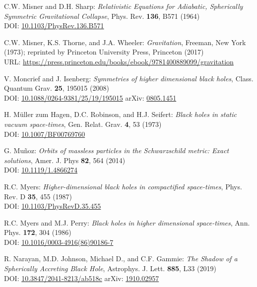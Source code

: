 \begin{thebibliography}{123}
C.W. Misner and D.H. Sharp:
{\em Relativistic Equations for Adiabatic, Spherically Symmetric Gravitational Collapse},
Phys. Rev. {\bf 136}, B571 (1964)\\
DOI: \href{https://doi.org/10.1103/PhysRev.136.B571}{10.1103/PhysRev.136.B571}

C.W. Misner, K.S. Thorne, and J.A. Wheeler:
{\em Gravitation},
Freeman, New York (1973);
reprinted by Princeton University Press, Princeton (2017)\\
URL: \url{https://press.princeton.edu/books/ebook/9781400889099/gravitation}

V. Moncrief and J. Isenberg:
{\em Symmetries of higher dimensional black holes},
Class. Quantum Grav. {\bf 25}, 195015 (2008)\\
DOI: \href{https://doi.org/10.1088/0264-9381/25/19/195015}{10.1088/0264-9381/25/19/195015}\hfill
arXiv: \href{https://arxiv.org/abs/0805.1451}{0805.1451}

H. Müller zum Hagen, D.C. Robinson, and H.J. Seifert:
{\em Black holes in static vacuum space-times},
Gen. Relat. Grav. {\bf 4}, 53 (1973)\\
DOI: \href{https://doi.org/10.1007/BF00769760}{10.1007/BF00769760}

G. Mu\~noz:
{\em Orbits of massless particles in the Schwarzschild metric: Exact solutions},
Amer. J. Phys {\bf 82}, 564 (2014)\\
DOI: \href{https://doi.org/10.1119/1.4866274}{10.1119/1.4866274}

R.C. Myers:
{\em Higher-dimensional black holes in compactified space-times},
Phys. Rev. D {\bf 35}, 455 (1987)\\
DOI: \href{https://doi.org/10.1103/PhysRevD.35.455}{10.1103/PhysRevD.35.455}

R.C. Myers and M.J. Perry:
{\em Black holes in higher dimensional space-times},
Ann. Phys. {\bf 172}, 304 (1986)\\
DOI: \href{https://doi.org/10.1016/0003-4916(86)90186-7}{10.1016/0003-4916(86)90186-7}

R. Narayan, M.D. Johnson, Michael D., and C.F. Gammie:
{\em The Shadow of a Spherically Accreting Black Hole},
Astrophys. J. Lett. {\bf 885}, L33 (2019)\\
DOI: \href{https://doi.org/10.3847/2041-8213/ab518c}{10.3847/2041-8213/ab518c}\hfill
arXiv: \href{https://arxiv.org/abs/1910.02957}{1910.02957}


\end{thebibliography}
